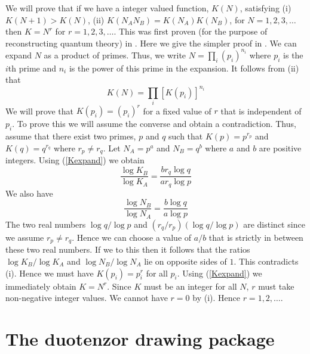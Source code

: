 \documentclass[10pt]{article}
\begin{document}
We will prove that if we have a integer valued function, $K(N)$, satisfying (i) $K(N+1)>K(N)$, (ii) $K(N_AN_B)=K(N_A)K(N_B)$, for $N=1, 2, 3, \dots$ then $K=N^r$ for $r=1, 2, 3, \dots$. This was first proven (for the purpose of reconstructing quantum theory) in \cite{hardy2001quantum}.  Here we give the simpler proof in \cite{hardy2010limited}.  We can expand $N$ as a product of primes.  Thus, we write $N=\prod_i (p_i)^{n_i}$ where $p_i$ is the $i$th prime and $n_i$ is the power of this prime in the expansion.  It follows from (ii) that
\begin{equation}\label{Kexpand}
K(N) = \prod_i [K(p_i)]^{n_i}
\end{equation}
We will prove that $K(p_i)=(p_i)^r$ for a fixed value of $r$ that is independent of $p_i$.  To prove this we will assume the converse and obtain a contradiction. Thus, assume that there exist two primes, $p$ and $q$ such that $K(p)=p^{r_p}$ and $K(q)=q^{r_q}$ where $r_p\not= r_q$. Let $N_A=p^a$ and $N_B=q^b$ where $a$ and $b$ are positive integers.  Using (\ref{Kexpand}) we obtain
\begin{equation}
\frac{\log K_B  }{\log K_A} = \frac{br_q \log q}{ar_q \log p}
\end{equation}
We also have
\begin{equation}
\frac{\log N_B  }{\log N_A} = \frac{b \log q}{a \log p}
\end{equation}
The two real numbers $\log q/\log p$ and $(r_q/r_p)(\log q/\log p)$ are distinct since we assume $r_p\not= r_q$.  Hence we can choose a value of $a/b$ that is strictly in between these two real numbers.  If we to this then it follows that the ratios $\log K_B /\log K_A$ and $\log N_B / \log N_A$ lie on opposite sides of $1$.  This contradicts (i). Hence we must have $K(p_i)=p_i^r$ for all $p_i$.  Using (\ref{Kexpand}) we immediately obtain $K=N^r$. Since $K$ must be an integer for all $N$, $r$ must take non-negative integer values.  We cannot have $r=0$ by (i).  Hence $r=1, 2, \dots$.


\section{The duotenzor drawing package}\label{duotenzor}
\end{document}
